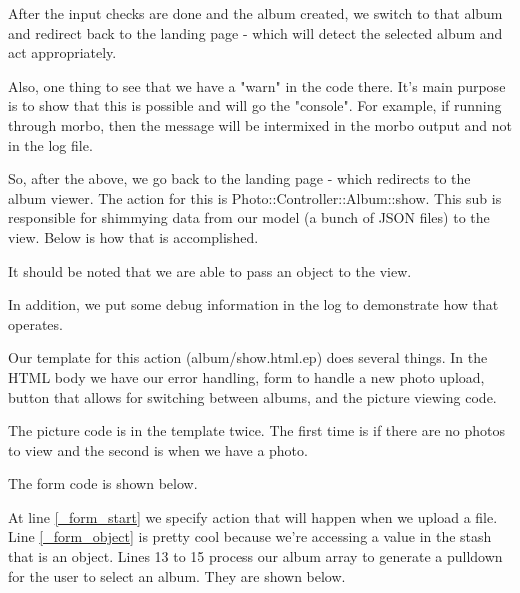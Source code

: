 \documentclass[14pt]{extreport}
\begin{document}
After the input checks are done and the album created, we switch to that album
and redirect back to the landing page - which will detect the selected album
and act appropriately.



Also, one thing to see that we have a "warn" in the code there. It's main
purpose is to show that this is possible and will go the "console". For
example, if running through morbo, then the message will be intermixed in the 
morbo output and not in the log file.

So, after the above, we go back to the landing page - which redirects to the
album viewer.  The action for this is Photo::Controller::Album::show. This sub
is responsible for shimmying data from our model (a bunch of JSON files) to the
view.  Below is how that is accomplished.

It should be noted that we are able to pass an object to the view.



In addition, we put some debug information in the log to demonstrate how that
operates.



Our template for this action (album/show.html.ep) does several things. In the
HTML body we have our error handling, form to handle a new photo upload, button
that allows for switching between albums, and the picture viewing code.  

The picture code is in the template twice.  The first time is if there are no
photos to view and the second is when we have a photo.

The form code is shown below.



At line \ref{_form_start} we specify action that will happen when we upload a
file.  Line \ref{_form_object} is pretty cool because we're accessing a value in
the stash that is an object.  Lines 13 to 15 process our album array to
generate a pulldown for the user to select an album.  They are shown below.
\end{document}
